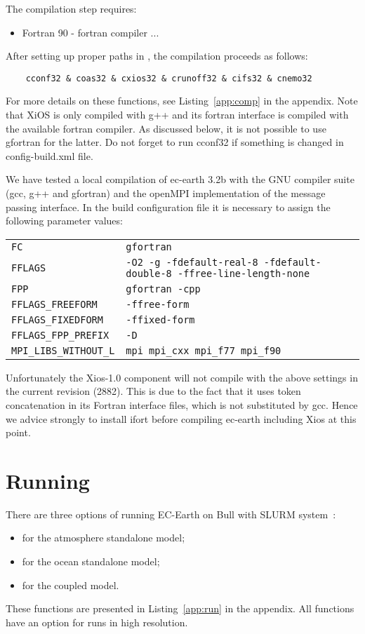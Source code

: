 The compilation step requires:
\begin{itemize}
    \item Fortran 90 - fortran compiler
    ...
\end{itemize}



After setting up proper paths in , the compilation proceeds as follows:
\begin{verbatim}
    cconf32 & coas32 & cxios32 & crunoff32 & cifs32 & cnemo32  
\end{verbatim}
For more details on these functions, see Listing~\ref{app:comp} in the appendix. 
Note that XiOS is only compiled with g++ and its fortran interface is compiled with the available fortran compiler. As discussed below, it is not possible to use gfortran for the latter. Do not forget to run cconf32 if something is changed in config-build.xml file.

We have tested a local compilation of ec-earth 3.2b with the GNU compiler suite (gcc, g++ and gfortran) and the openMPI implementation of the message passing interface. In the build configuration file it is necessary to assign the following parameter values:
\begin{center}
\begin{tabular}{ll}
\texttt{FC}&\texttt{gfortran}\\
\texttt{FFLAGS}&\texttt{-O2 -g -fdefault-real-8 -fdefault-double-8 -ffree-line-length-none}\\
\texttt{FPP}&\texttt{gfortran -cpp}\\
\texttt{FFLAGS\_FREEFORM}&\texttt{-ffree-form}\\
\texttt{FFLAGS\_FIXEDFORM}&\texttt{-ffixed-form}\\
\texttt{FFLAGS\_FPP\_PREFIX}&\texttt{-D}\\
\texttt{MPI\_LIBS\_WITHOUT\_L}&\texttt{mpi mpi\_cxx mpi\_f77 mpi\_f90}\\
\end{tabular}
\end{center}
Unfortunately the Xios-1.0 component will not compile with the above settings in the current revision (2882). This is due to the fact that it uses token concatenation in its Fortran interface files, which is not substituted by gcc. Hence we advice strongly to install ifort before compiling ec-earth including Xios at this point. 

\section{Running}
There are three options of running EC-Earth on Bull with SLURM system~\cite{slurm}:
\begin{itemize}
  \item {} for the atmosphere standalone model;    
  \item {} for the ocean standalone model;    
  \item {} for the coupled model.
\end{itemize}
These functions are presented in Listing~\ref{app:run} in the appendix. All functions have an option  for runs in high resolution. 